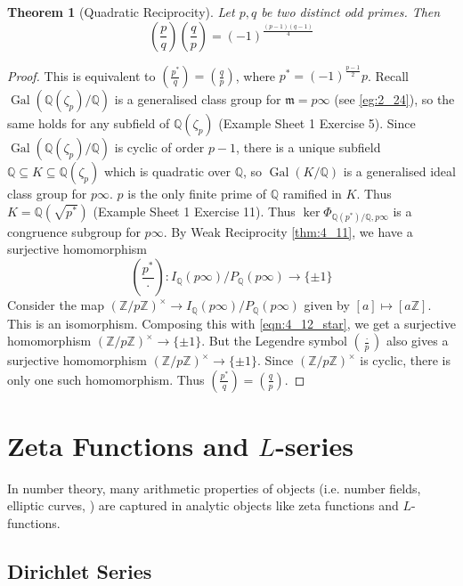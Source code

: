 \documentclass[11pt]{article}
\theoremstyle{definition}
\theoremstyle{plain}
\newtheorem{theorem}[definition]{Theorem}
\theoremstyle{remark}
\DeclareMathOperator{\Gal}{Gal}
\newcommand{\ZZ}{\mathbb{Z}}
\newcommand{\QQ}{\mathbb{Q}}
\newcommand{\fm}{\mathfrak{m}}
\newcommand{\leg}[2]{\left(\frac{#1}{#2}\right)}
\begin{document}
\begin{theorem}[Quadratic Reciprocity]\label{thm:4_12}
    Let $p, q$ be two distinct odd primes. Then
    \begin{equation*}
        \leg{p}{q} \leg{q}{p} = (-1)^{\frac{(p-1)(q-1)}{4}}
    \end{equation*}
\end{theorem}
\begin{proof}
    This is equivalent to $\leg{p^*}{q} = \leg{q}{p}$, where $p^* = (-1)^{\frac{p-1}{2}} p$. Recall $\Gal(\QQ(\zeta_p)/\QQ)$ is a generalised class group for $\fm = p \infty$ (see \autoref{eg:2_24}), so the same holds for any subfield of $\QQ(\zeta_p)$ (Example Sheet 1 Exercise 5). Since $\Gal(\QQ(\zeta_p)/\QQ)$ is cyclic of order $p-1$, there is a unique subfield $\QQ \subseteq K \subseteq \QQ(\zeta_p)$ which is quadratic over $\QQ$, so $\Gal(K/\QQ)$ is a generalised ideal class group for $p \infty$. $p$ is the only finite prime of $\QQ$ ramified in $K$. Thus $K = \QQ(\sqrt{p^*})$ (Example Sheet 1 Exercise 11). Thus $\ker \Phi_{\QQ(p^*)/\QQ, p \infty}$ is a congruence subgroup for $p \infty$. By Weak Reciprocity \autoref{thm:4_11}, %
    we have a surjective homomorphism
    \begin{equation}\label{eqn:4_12_star}
        \leg{p^*}{\cdot} : I_\QQ(p \infty) / P_\QQ(p \infty) \to \{\pm 1\}
    \end{equation}
    Consider the map $(\ZZ / p \ZZ)^\times \to I_\QQ(p\infty)/P_\QQ(p\infty)$ given by $[a] \mapsto [a \ZZ]$. This is an isomorphism. Composing this with \eqref{eqn:4_12_star}, we get a surjective homomorphism $(\ZZ/p\ZZ)^\times \to \{\pm 1\}$. But the Legendre symbol $\leg{\cdot}{p}$ also gives a surjective homomorphism $(\ZZ/p\ZZ)^\times \to \{\pm 1\}$. Since $(\ZZ/p\ZZ)^\times$ is cyclic, there is only one such homomorphism. Thus $\leg{p^*}{q} = \leg{q}{p}$.
\end{proof}

\section{Zeta Functions and \texorpdfstring{$L$}{L}-series}
In number theory, many arithmetic properties of objects (i.e. number fields, elliptic curves, \textellipsis) are captured in analytic objects like zeta functions and $L$-functions.

\subsection{Dirichlet Series}
\end{document}
